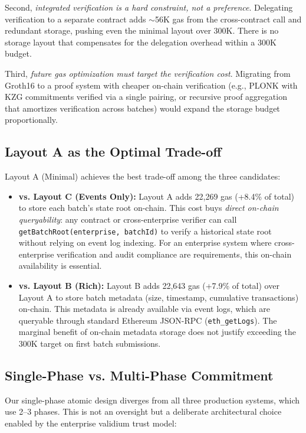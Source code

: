 Second, \emph{integrated verification is a hard constraint, not a preference}. Delegating
verification to a separate contract adds $\sim$56K gas from the cross-contract call and
redundant storage, pushing even the minimal layout over 300K. There is no storage layout
that compensates for the delegation overhead within a 300K budget.

Third, \emph{future gas optimization must target the verification cost}. Migrating from
Groth16 to a proof system with cheaper on-chain verification (e.g., PLONK with KZG
commitments verified via a single pairing, or recursive proof aggregation that amortizes
verification across batches) would expand the storage budget proportionally.

\subsection{Layout A as the Optimal Trade-off}

Layout A (Minimal) achieves the best trade-off among the three candidates:

\begin{itemize}
\item \textbf{vs. Layout C (Events Only):} Layout A adds 22,269 gas (+8.4\% of total) to
store each batch's state root on-chain. This cost buys \emph{direct on-chain queryability}:
any contract or cross-enterprise verifier can call \texttt{getBatchRoot(enterprise, batchId)}
to verify a historical state root without relying on event log indexing. For an enterprise
system where cross-enterprise verification and audit compliance are requirements, this
on-chain availability is essential.

\item \textbf{vs. Layout B (Rich):} Layout B adds 22,643 gas (+7.9\% of total) over
Layout A to store batch metadata (size, timestamp, cumulative transactions) on-chain.
This metadata is already available via event logs, which are queryable through standard
Ethereum JSON-RPC (\texttt{eth\_getLogs}). The marginal benefit of on-chain metadata
storage does not justify exceeding the 300K target on first batch submissions.
\end{itemize}

\subsection{Single-Phase vs. Multi-Phase Commitment}

Our single-phase atomic design diverges from all three production systems, which use 2--3
phases. This is not an oversight but a deliberate architectural choice enabled by the
enterprise validium trust model:

